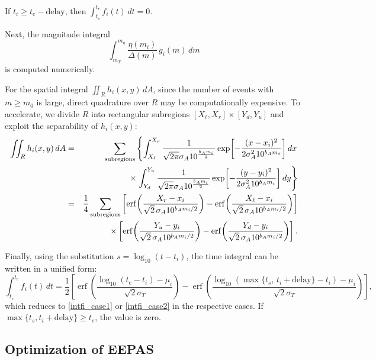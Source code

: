 \documentclass[linenum,doublespace,onecolumn]{SSA-SRL}
\theoremstyle{lemma}
\begin{document}
If $t_i \ge t_e - \text{delay}$, then $\int_{t_s}^{t_e} f_i(t)\, dt = 0$.

Next, the magnitude integral
\[
\int_{m_T}^{m_u} \frac{\eta(m_i)}{\Delta(m)}\, g_i(m)\, dm
\]
is computed numerically.

For the spatial integral $\iint_R h_i(x, y)\, dA$, since the number of events with $m \ge m_0$ is large, direct quadrature over $R$ may be computationally expensive. To accelerate, we divide $R$ into rectangular subregions $[X_\ell, X_r] \times [Y_d, Y_u]$ and exploit the separability of $h_i(x, y)$:
\begin{eqnarray}
\iint_{R} h_i(x, y)\, dA 
&=& \sum_{\text{subregions}} \left\{ \int_{X_\ell}^{X_r} \frac{1}{\sqrt{2\pi} \sigma_A 10^{\frac{b_A m_i}{2}}} 
\exp\!\left[ -\frac{(x - x_i)^2}{2 \sigma_A^2 10^{b_A m_i}} \right] dx \right. \notag \\
&& \hspace{2cm} \times \left. \int_{Y_d}^{Y_u} \frac{1}{\sqrt{2\pi} \sigma_A 10^{\frac{b_A m_i}{2}}} 
\exp\!\left[ -\frac{(y - y_i)^2}{2 \sigma_A^2 10^{b_A m_i}} \right] dy \right\} \notag \\
&=& \frac{1}{4} \sum_{\text{subregions}} \left[ \operatorname{erf}\!\left( \frac{X_r - x_i}{\sqrt{2}\, \sigma_A 10^{b_A m_i / 2}} \right) 
- \operatorname{erf}\!\left( \frac{X_\ell - x_i}{\sqrt{2}\, \sigma_A 10^{b_A m_i / 2}} \right) \right] \notag \\
&& \times \left[ \operatorname{erf}\!\left( \frac{Y_u - y_i}{\sqrt{2}\, \sigma_A 10^{b_A m_i / 2}} \right) 
- \operatorname{erf}\!\left( \frac{Y_d - y_i}{\sqrt{2}\, \sigma_A 10^{b_A m_i / 2}} \right) \right].
\label{inth1i}
\end{eqnarray}

Finally, using the substitution $s = \log_{10}(t - t_i)$, the time integral can be written in a unified form:
\[
\int_{t_s}^{t_e} f_i(t)\, dt
= \frac{1}{2} \left[
\operatorname{erf}\!\left( \frac{\log_{10}(t_e - t_i) - \mu_i}{\sqrt{2} \sigma_T} \right)
- \operatorname{erf}\!\left( \frac{\log_{10}(\max\{t_s,\, t_i + \text{delay}\} - t_i) - \mu_i}{\sqrt{2} \sigma_T} \right)
\right],
\]
which reduces to \eqref{intfi_case1} or \eqref{intfi_case2} in the respective cases. If $\max\{t_s, t_i + \text{delay}\} \ge t_e$, the value is zero.


\subsection{Optimization of EEPAS}
\end{document}
